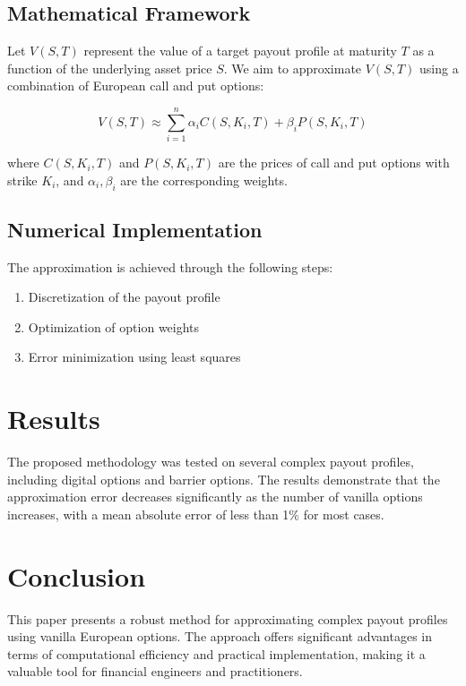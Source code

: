 \documentclass[12pt]{article}
\begin{document}
\subsection{Mathematical Framework}
Let \( V(S, T) \) represent the value of a target payout profile at maturity \( T \) as a function of the underlying asset price \( S \). We aim to approximate \( V(S, T) \) using a combination of European call and put options:

\begin{equation}
V(S, T) \approx \sum_{i=1}^{n} \alpha_i C(S, K_i, T) + \beta_i P(S, K_i, T)
\end{equation}

where \( C(S, K_i, T) \) and \( P(S, K_i, T) \) are the prices of call and put options with strike \( K_i \), and \( \alpha_i, \beta_i \) are the corresponding weights.

\subsection{Numerical Implementation}
The approximation is achieved through the following steps:
\begin{enumerate}
    \item Discretization of the payout profile
    \item Optimization of option weights
    \item Error minimization using least squares
\end{enumerate}

\section{Results}
The proposed methodology was tested on several complex payout profiles, including digital options and barrier options. The results demonstrate that the approximation error decreases significantly as the number of vanilla options increases, with a mean absolute error of less than 1\% for most cases.

\section{Conclusion}
This paper presents a robust method for approximating complex payout profiles using vanilla European options. The approach offers significant advantages in terms of computational efficiency and practical implementation, making it a valuable tool for financial engineers and practitioners.



\end{document}
